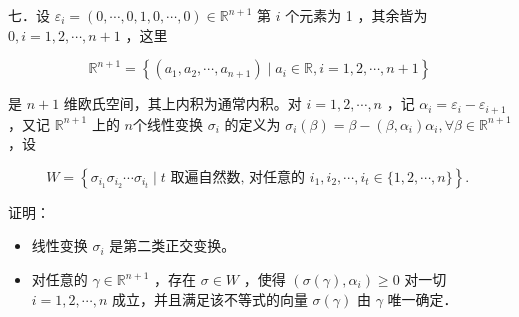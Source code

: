 \documentclass{article}
\begin{document}
七．设 \(\varepsilon_{i}=(0, \cdots, 0,1,0, \cdots, 0) \in \mathbb{R}^{n+1}\) 第 \(i\) 个元素为 1 ，其余皆为 \(0, i=1,2, \cdots, n+1\) ，这里

\[
\mathbb{R}^{n+1}=\left\{\left(a_{1}, a_{2}, \cdots, a_{n+1}\right) \mid a_{i} \in \mathbb{R}, i=1,2, \cdots, n+1\right\}
\]

是 \(n+1\) 维欧氏空间，其上内积为通常内积。对 \(i=1,2, \cdots, n\) ，记 \(\alpha_{i}=\varepsilon_{i}-\varepsilon_{i+1}\) ，又记 \(\mathbb{R}^{n+1}\) 上的 \(n\)个线性变换 \(\sigma_{i}\) 的定义为 \(\sigma_{i}(\beta)=\beta-\left(\beta, \alpha_{i}\right) \alpha_{i}, \forall \beta \in \mathbb{R}^{n+1}\) ，设

\[
W=\left\{\sigma_{i_{1}} \sigma_{i_{2}} \cdots \sigma_{i_{t}} \mid t \text { 取遍自然数, 对任意的 } i_{1}, i_{2}, \cdots, i_{t} \in\{1,2, \cdots, n\}\right\} \text {. }
\]

证明：

\begin{itemize}

  \item[1．] 线性变换 \(\sigma_{i}\) 是第二类正交变换。

  \item[2．] 对任意的 \(\gamma \in \mathbb{R}^{n+1}\) ，存在 \(\sigma \in W\) ，使得 \(\left(\sigma(\gamma), \alpha_{i}\right) \geq 0\) 对一切 \(i=1,2, \cdots, n\) 成立，并且满足该不等式的向量 \(\sigma(\gamma)\) 由 \(\gamma\) 唯一确定．
\end{itemize}
\end{document}
